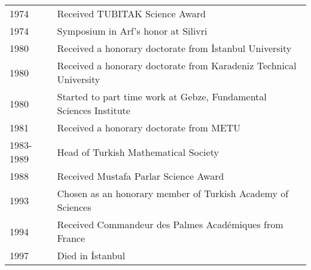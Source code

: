 \documentclass[12pt]{amsart}
\begin{document}
\begin{tabular}{ll}
1974 & Received TUBITAK Science Award \\
1974 & Symposium in Arf's honor at Silivri \\
1980 & Received a honorary doctorate from {\.I}stanbul  University \\
1980 & Received a honorary doctorate from Karadeniz Technical University \\
1980 & Started to part time work at Gebze,  Fundamental Sciences Institute \\
1981 & Received a honorary doctorate from METU \\
1983-1989 & Head of Turkish Mathematical Society \\
1988 & Received Mustafa Parlar Science Award \\
1993 & Chosen as an honorary member of Turkish Academy of Sciences \\
1994 & Received Commandeur des Palmes Acad\'emiques from France \\
1997 & Died in {\.I}stanbul
\end{tabular}
\end{document}
